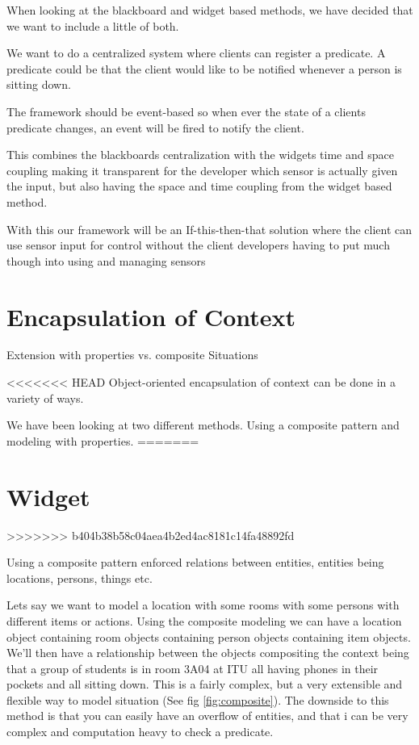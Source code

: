 \documentclass[]{report}
\begin{document}
When looking at the blackboard and widget based methods, we have decided that we want to include a little of both.

We want to do a centralized system where clients can register a predicate. A predicate could be that the client would like to be notified whenever a person is sitting down.

The framework should be event-based so when ever the state of a clients predicate changes, an event will be fired to notify the client.  

This combines the blackboards centralization with the widgets time and space coupling making it transparent for the developer which sensor is actually given the input, but also having the space and time coupling from the widget based method.

With this our framework will be an If-this-then-that solution where the client can use sensor input for control without the  client developers having to put much though into using and managing sensors   


\section{Encapsulation of Context}

Extension with properties vs. composite
Situations

<<<<<<< HEAD
Object-oriented encapsulation of context can be done in a variety of ways.

We have been looking at two different methods. Using a composite pattern and modeling with properties.
=======
\section{Widget}
>>>>>>> b404b38b58c04aea4b2ed4ac8181c14fa48892fd

Using a composite pattern enforced relations between entities, entities being locations, persons, things etc.

Lets say we want to model a location with some rooms with some persons with different items or actions. Using the composite modeling we can have a location object containing room objects containing person objects containing item objects. We'll then have a relationship between the objects compositing the context being that a group of students is in room 3A04 at ITU all having phones in their pockets and all sitting down. This is a fairly complex, but a very extensible and flexible way to model situation (See fig \ref{fig:composite}). The downside to this method is that you can easily have an overflow of entities, and that i can be very complex and computation heavy to check a predicate.
\end{document}
